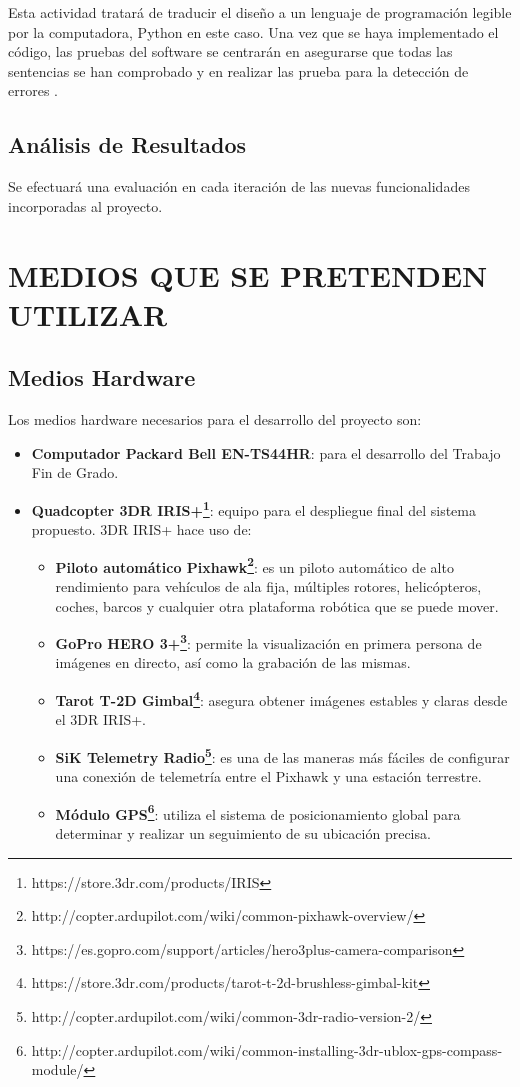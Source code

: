 \documentclass{pre-tfg}
\begin{document}
Esta actividad tratará de traducir el diseño a un lenguaje de programación legible por la computadora, Python en este caso. Una vez que se haya implementado el código, las pruebas del software se centrarán en asegurarse que todas las sentencias se han comprobado y en realizar las prueba para la detección de errores \cite{pressman}.

\subsection{Análisis de Resultados}

Se efectuará una evaluación en cada iteración de las nuevas funcionalidades incorporadas al proyecto.

\section{MEDIOS QUE SE PRETENDEN UTILIZAR}

\subsection{Medios Hardware}
Los medios hardware necesarios para el desarrollo del proyecto son:

\begin{itemize}
\item \textbf{Computador Packard Bell EN-TS44HR}: para el desarrollo del Trabajo Fin de Grado.
\item \textbf{Quadcopter 3DR IRIS+\footnote{https://store.3dr.com/products/IRIS}}: equipo para el despliegue final del sistema propuesto. 3DR IRIS+ hace uso de:

\begin{itemize}
\item \textbf{Piloto automático Pixhawk\footnote{http://copter.ardupilot.com/wiki/common-pixhawk-overview/}}: es un piloto automático de alto rendimiento para vehículos de ala fija, múltiples rotores, helicópteros, coches, barcos y cualquier otra plataforma robótica que se puede mover.
\item \textbf{GoPro HERO 3+\footnote{https://es.gopro.com/support/articles/hero3plus-camera-comparison}}: permite la visualización en primera persona de imágenes en directo, así como la grabación de las mismas.
\item \textbf{Tarot T-2D Gimbal\footnote{https://store.3dr.com/products/tarot-t-2d-brushless-gimbal-kit}}: asegura obtener imágenes estables y claras desde el 3DR IRIS+.
\item \textbf{SiK Telemetry Radio\footnote{http://copter.ardupilot.com/wiki/common-3dr-radio-version-2/}}: es una de las maneras más fáciles de configurar una conexión de telemetría entre el Pixhawk y una estación terrestre.
\item \textbf{Módulo GPS\footnote{http://copter.ardupilot.com/wiki/common-installing-3dr-ublox-gps-compass-module/}}: utiliza el sistema de posicionamiento global para determinar y realizar un seguimiento de su ubicación precisa.
\end{itemize}

\end{itemize}
\end{document}
